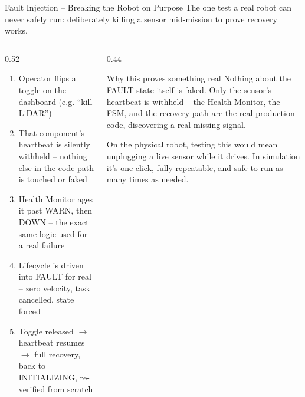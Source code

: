\documentclass[aspectratio=169, 11pt]{beamer}
\begin{document}
\begin{frame}{Fault Injection -- Breaking the Robot on Purpose}
  \footnotesize
  The one test a real robot can never safely run: deliberately killing a sensor mid-mission to prove recovery works.
  \begin{columns}[T]
    \begin{column}{0.52\textwidth}
      \begin{enumerate}
        \footnotesize
        \item Operator flips a toggle on the dashboard (e.g. ``kill LiDAR'')
        \item That component's heartbeat is silently withheld -- nothing else in the code path is touched or faked
        \item Health Monitor ages it past WARN, then DOWN -- the exact same logic used for a real failure
        \item Lifecycle is driven into FAULT for real -- zero velocity, task cancelled, state forced
        \item Toggle released $\rightarrow$ heartbeat resumes $\rightarrow$ full recovery, back to INITIALIZING, re-verified from scratch
      \end{enumerate}
    \end{column}
    \begin{column}{0.44\textwidth}
      \begin{block}{Why this proves something real}
        \footnotesize
        Nothing about the FAULT state itself is faked. Only the sensor's heartbeat is withheld -- the Health Monitor, the FSM, and the recovery path are the real production code, discovering a real missing signal.

        \vspace{0.15cm}
        On the physical robot, testing this would mean unplugging a live sensor while it drives. In simulation it's one click, fully repeatable, and safe to run as many times as needed.
      \end{block}
    \end{column}
  \end{columns}
\end{frame}
\end{document}
